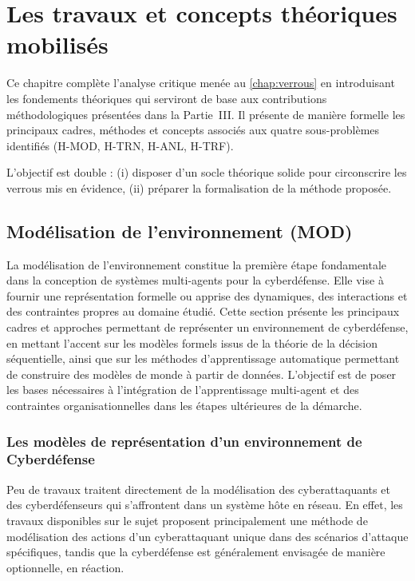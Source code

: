 \clearpage
\thispagestyle{empty}
\null
\newpage

\chapter{Les travaux et concepts théoriques mobilisés}
\label{chap:concepts}

\noindent
Ce chapitre complète l’analyse critique menée au \autoref{chap:verrous} en introduisant
les fondements théoriques qui serviront de base aux contributions méthodologiques
présentées dans la Partie~III.
Il présente de manière formelle les principaux cadres, méthodes et concepts
associés aux quatre sous-problèmes identifiés (H-MOD, H-TRN, H-ANL, H-TRF).

L’objectif est double :
(i) disposer d’un socle théorique solide pour circonscrire les verrous mis en évidence,
(ii) préparer la formalisation de la méthode proposée.

\section{Modélisation de l'environnement (MOD)}

\noindent
La modélisation de l'environnement constitue la première étape fondamentale dans la conception de systèmes multi-agents pour la cyberdéfense. Elle vise à fournir une représentation formelle ou apprise des dynamiques, des interactions et des contraintes propres au domaine étudié. Cette section présente les principaux cadres et approches permettant de représenter un environnement de cyberdéfense, en mettant l'accent sur les modèles formels issus de la théorie de la décision séquentielle, ainsi que sur les méthodes d'apprentissage automatique permettant de construire des modèles de monde à partir de données. L'objectif est de poser les bases nécessaires à l'intégration de l'apprentissage multi-agent et des contraintes organisationnelles dans les étapes ultérieures de la démarche.

\subsection{Les modèles de représentation d'un environnement de Cyberdéfense}

Peu de travaux traitent directement de la modélisation des cyberattaquants et des cyberdéfenseurs qui s'affrontent dans un système hôte en réseau. En effet, les travaux disponibles sur le sujet proposent principalement une méthode de modélisation des actions d'un cyberattaquant unique dans des scénarios d'attaque spécifiques, tandis que la cyberdéfense est généralement envisagée de manière optionnelle, en réaction.

